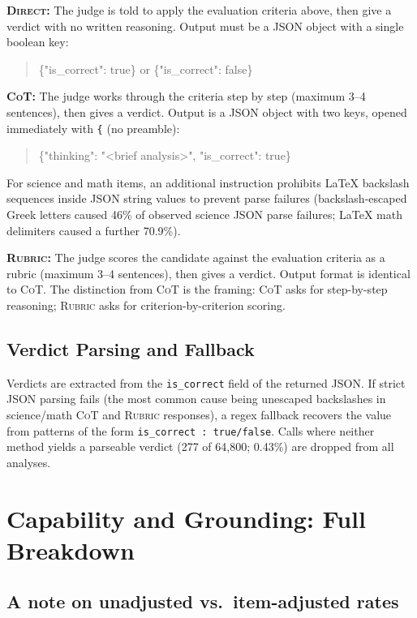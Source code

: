 \documentclass{article}
\begin{document}
\textbf{\textsc{Direct}:} The judge is told to apply the evaluation criteria
above, then give a verdict with no written reasoning. Output must be a JSON
object with a single boolean key:
\begin{quote}\ttfamily
\{"is\_correct": true\} \textrm{ or } \{"is\_correct": false\}
\end{quote}

\textbf{\textsc{CoT}:} The judge works through the criteria step by step
(maximum 3--4 sentences), then gives a verdict. Output is a JSON object with
two keys, opened immediately with \verb|{| (no preamble):
\begin{quote}\ttfamily
\{"thinking": "<brief analysis>", "is\_correct": true\}
\end{quote}
For science and math items, an additional instruction prohibits LaTeX
backslash sequences inside JSON string values to prevent parse failures
(backslash-escaped Greek letters caused 46\% of observed science JSON parse
failures; LaTeX math delimiters caused a further 70.9\%).

\textbf{\textsc{Rubric}:} The judge scores the candidate against the
evaluation criteria as a rubric (maximum 3--4 sentences), then gives a verdict.
Output format is identical to \textsc{CoT}. The distinction from \textsc{CoT}
is the framing: \textsc{CoT} asks for step-by-step reasoning; \textsc{Rubric}
asks for criterion-by-criterion scoring.

\subsection{Verdict Parsing and Fallback}

Verdicts are extracted from the \texttt{is\_correct} field of the returned JSON.
If strict JSON parsing fails (the most common cause being unescaped backslashes
in science/math \textsc{CoT} and \textsc{Rubric} responses), a regex fallback
recovers the value from patterns of the form
\texttt{is\_correct\,:\,true/false}. Calls where neither method yields a
parseable verdict (277 of 64{,}800; 0.43\%) are dropped from all analyses.

\section{Capability and Grounding: Full Breakdown}
\label{app:capability}

\subsection*{A note on unadjusted vs.\ item-adjusted rates}
\end{document}
